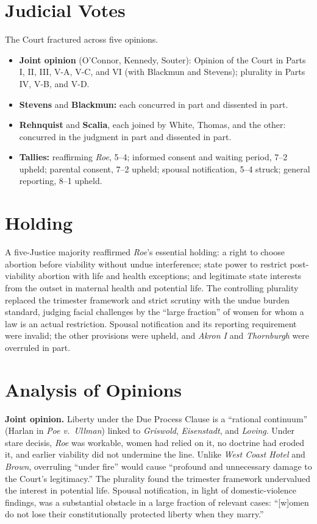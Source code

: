\documentclass[12pt]{article}
\begin{document}
\section{Judicial Votes}

The Court fractured across five opinions.
\begin{itemize}
\item \textbf{Joint opinion} (O'Connor, Kennedy, Souter): Opinion of the Court in Parts I, II, III, V-A, V-C, and VI (with Blackmun and Stevens); plurality in Parts IV, V-B, and V-D.
\item \textbf{Stevens} and \textbf{Blackmun:} each concurred in part and dissented in part.
\item \textbf{Rehnquist} and \textbf{Scalia}, each joined by White, Thomas, and the other: concurred in the judgment in part and dissented in part.
\item \textbf{Tallies:} reaffirming \textit{Roe}, 5--4; informed consent and waiting period, 7--2 upheld; parental consent, 7--2 upheld; spousal notification, 5--4 struck; general reporting, 8--1 upheld.
\end{itemize}

\section{Holding}

A five-Justice majority reaffirmed \textit{Roe}'s essential holding: a right to choose abortion before viability without undue interference; state power to restrict post-viability abortion with life and health exceptions; and legitimate state interests from the outset in maternal health and potential life. The controlling plurality replaced the trimester framework and strict scrutiny with the undue burden standard, judging facial challenges by the ``large fraction'' of women for whom a law is an actual restriction. Spousal notification and its reporting requirement were invalid; the other provisions were upheld, and \textit{Akron I} and \textit{Thornburgh} were overruled in part.

\section{Analysis of Opinions}

\textbf{Joint opinion.} Liberty under the Due Process Clause is a ``rational continuum'' (Harlan in \textit{Poe v.\ Ullman}) linked to \textit{Griswold}, \textit{Eisenstadt}, and \textit{Loving}. Under stare decisis, \textit{Roe} was workable, women had relied on it, no doctrine had eroded it, and earlier viability did not undermine the line. Unlike \textit{West Coast Hotel} and \textit{Brown}, overruling ``under fire'' would cause ``profound and unnecessary damage to the Court's legitimacy.'' The plurality found the trimester framework undervalued the interest in potential life. Spousal notification, in light of domestic-violence findings, was a substantial obstacle in a large fraction of relevant cases: ``[w]omen do not lose their constitutionally protected liberty when they marry.''
\end{document}

